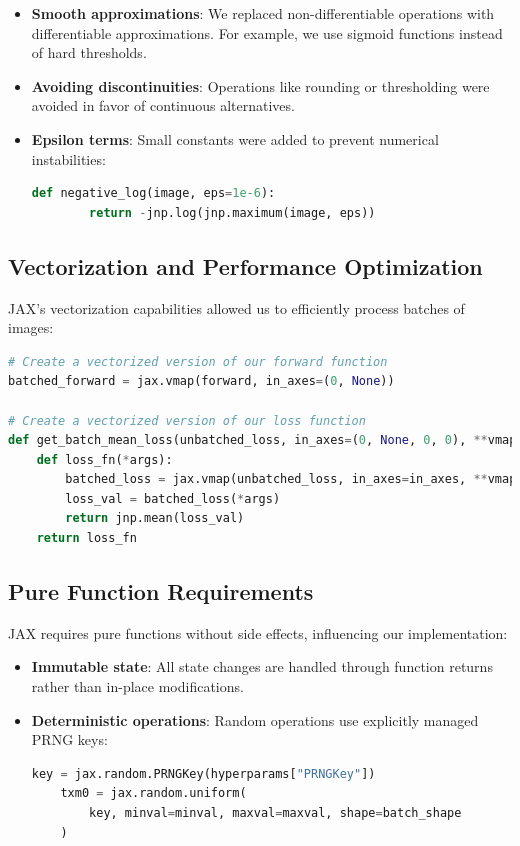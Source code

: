 \documentclass[nomenclature, english, bibtex]{kththesis}
\numberwithin{listing}{chapter}
\begin{document}
\begin{itemize}
    \item \textbf{Smooth approximations}: We replaced non-differentiable operations with differentiable approximations. For example, we use sigmoid functions instead of hard thresholds.
    
    \item \textbf{Avoiding discontinuities}: Operations like rounding or thresholding were avoided in favor of continuous alternatives.
    
    \item \textbf{Epsilon terms}: Small constants were added to prevent numerical instabilities:
    \begin{lstlisting}[language=Python]
    def negative_log(image, eps=1e-6):
        return -jnp.log(jnp.maximum(image, eps))
    \end{lstlisting}
\end{itemize}

\subsection{Vectorization and Performance Optimization}
JAX's vectorization capabilities allowed us to efficiently process batches of images:

\begin{lstlisting}[language=Python]
# Create a vectorized version of our forward function
batched_forward = jax.vmap(forward, in_axes=(0, None))

# Create a vectorized version of our loss function
def get_batch_mean_loss(unbatched_loss, in_axes=(0, None, 0, 0), **vmap_args):
    def loss_fn(*args):
        batched_loss = jax.vmap(unbatched_loss, in_axes=in_axes, **vmap_args)
        loss_val = batched_loss(*args)
        return jnp.mean(loss_val)
    return loss_fn
\end{lstlisting}

\subsection{Pure Function Requirements}
JAX requires pure functions without side effects, influencing our implementation:

\begin{itemize}
    \item \textbf{Immutable state}: All state changes are handled through function returns rather than in-place modifications.
    \item \textbf{Deterministic operations}: Random operations use explicitly managed PRNG keys:
    \begin{lstlisting}[language=Python]
    key = jax.random.PRNGKey(hyperparams["PRNGKey"])
    txm0 = jax.random.uniform(
        key, minval=minval, maxval=maxval, shape=batch_shape
    )
    \end{lstlisting}
\end{itemize}
\end{document}
